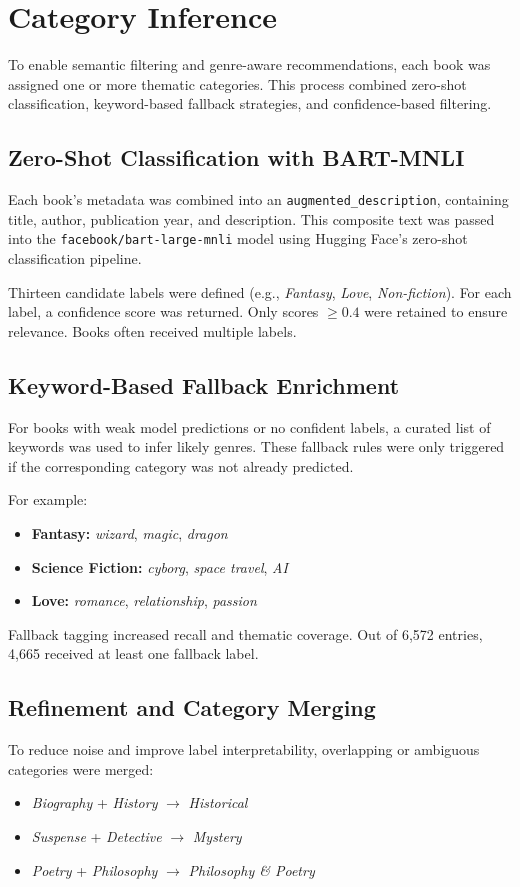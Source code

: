 \chapter{Category Inference}
\label{chapter:categories}

To enable semantic filtering and genre-aware recommendations, each book was assigned one or more thematic categories. This process combined zero-shot classification, keyword-based fallback strategies, and confidence-based filtering.

\section{Zero-Shot Classification with BART-MNLI}
Each book's metadata was combined into an \texttt{augmented\_description}, containing title, author, publication year, and description. This composite text was passed into the \texttt{facebook/bart-large-mnli} model using Hugging Face’s zero-shot classification pipeline.

Thirteen candidate labels were defined (e.g., \textit{Fantasy}, \textit{Love}, \textit{Non-fiction}). For each label, a confidence score was returned. Only scores $\geq 0.4$ were retained to ensure relevance. Books often received multiple labels.

\section{Keyword-Based Fallback Enrichment}
For books with weak model predictions or no confident labels, a curated list of keywords was used to infer likely genres. These fallback rules were only triggered if the corresponding category was not already predicted.

For example:
\begin{itemize}
    \item \textbf{Fantasy:} \textit{wizard}, \textit{magic}, \textit{dragon}
    \item \textbf{Science Fiction:} \textit{cyborg}, \textit{space travel}, \textit{AI}
    \item \textbf{Love:} \textit{romance}, \textit{relationship}, \textit{passion}
\end{itemize}

Fallback tagging increased recall and thematic coverage. Out of 6,572 entries, 4,665 received at least one fallback label.

\section{Refinement and Category Merging}
To reduce noise and improve label interpretability, overlapping or ambiguous categories were merged:
\begin{itemize}
    \item \textit{Biography} + \textit{History} $\rightarrow$ \textit{Historical}
    \item \textit{Suspense} + \textit{Detective} $\rightarrow$ \textit{Mystery}
    \item \textit{Poetry} + \textit{Philosophy} $\rightarrow$ \textit{Philosophy \& Poetry}
\end{itemize}

